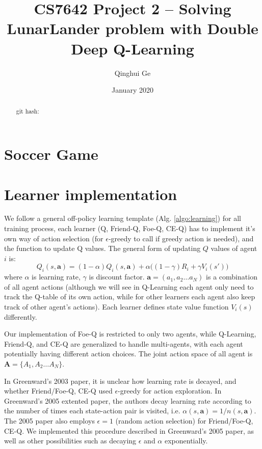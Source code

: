 \documentclass[conference]{IEEEtran}
\title{CS7642 Project 2 -- Solving LunarLander problem with Double Deep Q-Learning}
\author{Qinghui Ge}
\date{January 2020}
\begin{document}
	
	\maketitle
	
\begin{abstract}

	
	git hash: 
\end{abstract}
	
	
\section{Soccer Game}

\section{Learner implementation}
We follow a general off-policy learning template (Alg. \ref{algo:learning}) for all training process, each learner (Q, Friend-Q, Foe-Q, CE-Q) has to implement it's own way of action selection (for $\epsilon$-greedy to call if greedy action is needed), and the function to update Q values. The general form of updating $Q$ values of agent $i$ is:
\begin{equation}
Q_i(s, \mathbf{a}) = (1-\alpha) Q_i(s, \mathbf{a}) + \alpha  \big( (1-\gamma) R_i + \gamma V_i(s') \big)
\label{eq:update}
\end{equation}
where $\alpha$ is learning rate, $\gamma$ is discount factor. $\mathbf{a}=(a_1, a_2\dots a_N)$ is a combination of all agent actions (although we will see in Q-Learning each agent only need to track the Q-table of its own action, while for other learners each agent also keep track of other agent's actions). Each learner defines state value function $V_i(s)$ differently.

Our implementation of Foe-Q is restricted to only two agents, while Q-Learning, Friend-Q, and CE-Q are generalized to handle multi-agents, with each agent potentially having different action choices. The joint action space of all agent is $\mathbf{A}=\{A_1, A_2 \dots A_N\}$.

In Greenward's 2003 paper, it is unclear how learning rate is decayed, and whether Friend/Foe-Q, CE-Q used $\epsilon$-greedy for action exploration. In Greenward's 2005 extented paper, the authors decay learning rate according to the number of times each state-action pair is visited, i.e. $\alpha(s,\mathbf{a}) = 1/n(s,\mathbf{a})$. The 2005 paper also employs $\epsilon=1$ (random action selection) for Friend/Foe-Q, CE-Q. We implemented this procedure described in Greenward's 2005 paper, as well as other possibilities such as decaying $\epsilon$ and $\alpha$ exponentially.
\end{document}
